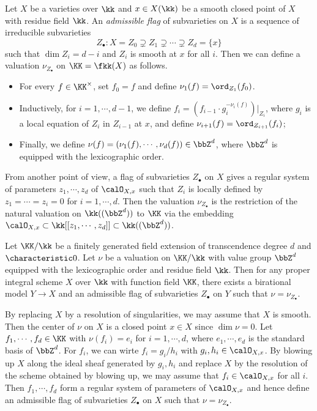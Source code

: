 \begin{example}
	Let $X$ be a varieties over $\kk$ and $x \in X(\kk)$ be a smooth closed point of $X$ with residue field $\kk$.
	An \emph{admissible flag} of subvarieties on $X$ is a sequence of irreducible subvarieties
	\[ Z_\bullet: X = Z_0 \supsetneq Z_1 \supsetneq \cdots \supsetneq Z_d = \{x\} \]
	such that $\dim Z_i = d-i$ and $Z_i$ is smooth at $x$ for all $i$.
	Then we can define a valuation $\nu_{Z_\bullet}$ on $\KK = \fkk(X)$ as follows.
	\begin{itemize}[nosep]
		\item For every $f \in \KK^\times$, set $f_0 = f$ and define $\nu_1(f) = \ord_{Z_1}(f_0)$.
		\item Inductively, for $i = 1,\cdots,d-1$, we define $f_i = \left( f_{i-1} \cdot g_i^{-\nu_i(f)} \right)|_{Z_i}$, where $g_i$ is a local equation of $Z_i$ in $Z_{i-1}$ at $x$, and define $\nu_{i+1}(f) = \ord_{Z_{i+1}}(f_i)$;
		\item Finally, we define $\nu(f) = (\nu_1(f),\cdots,\nu_d(f)) \in \bbZ^d$, where $\bbZ^d$ is equipped with the lexicographic order.
	\end{itemize}

	From another point of view, a flag of subvarieties $Z_\bullet$ on $X$ gives a regular system of parameters $z_1,\cdots,z_d$ of $\calO_{X,x}$ such that $Z_i$ is locally defined by $z_1 = \cdots = z_i = 0$ for $i = 1,\cdots,d$.
	Then the valuation $\nu_{Z_\bullet}$ is the restriction of the natural valuation on $\kk((\bbZ^d))$ to $\KK$ via the embedding $\calO_{X,x} \subset \kk[[z_1,\cdots,z_d]] \subset \kk((\bbZ^d))$.
\end{example}

\begin{remark}
	Let $\KK/\kk$ be a finitely generated field extension of transcendence degree $d$ and $\characteristic 0$.
	Let $\nu$ be a valuation on $\KK/\kk$ with value group $\bbZ^d$ equipped with the lexicographic order and residue field $\kk$.
	Then for any proper integral scheme $X$ over $\kk$ with function field $\KK$, there exists a birational model $Y \to X$ and an admissible flag of subvarieties $Z_\bullet$ on $Y$ such that $\nu = \nu_{Z_\bullet}$.

	By replacing $X$ by a resolution of singularities, we may assume that $X$ is smooth.
	Then the center of $\nu$ on $X$ is a closed point $x \in X$ since $\dim \nu = 0$.
	Let $f_1,\cdots,f_d \in \KK$ with $\nu(f_i) = e_i$ for $i = 1,\cdots,d$, where $e_1,\cdots,e_d$ is the standard basis of $\bbZ^d$.
	For $f_i$, we can wirte $f_i = g_i/h_i$ with $g_i,h_i \in \calO_{X,x}$.
	By blowing up $X$ along the ideal sheaf generated by $g_i,h_i$ and replace $X$ by the resolution of the scheme obtained by blowing up, we may assume that $f_i \in \calO_{X,x}$ for all $i$.
	Then $f_1,\cdots,f_d$ form a regular system of parameters of $\calO_{X,x}$ and hence define an admissible flag of subvarieties $Z_\bullet$ on $X$ such that $\nu = \nu_{Z_\bullet}$.
\end{remark}


